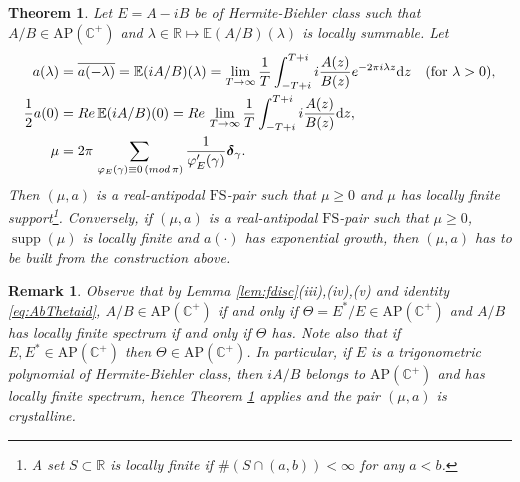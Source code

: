 \documentclass[a4paper,reqno,12pt]{amsart}
\DeclareMathOperator{\supp}{\mathrm{supp}}
\newtheorem{theorem}{Theorem}
\newtheorem{remark}{Remark}
\newcommand{\E}{\mathcal{E}}
\renewcommand{\H}{\mathbb{C}^+}
\renewcommand{\r}{\mathbb{R}}
\newcommand{\re}{{\rm Re}\,}
\newcommand{\bo}{\boldsymbol}
\newcommand{\la}{\lambda}
\newcommand{\ga}{\gamma}
\newcommand{\p}{\varphi}
\renewcommand{\d}{\mathrm{d}}
\newcommand{\1}{{\bf 1}}
\newcommand{\apc}{\mathrm{AP}(\H)}
\newcommand{\fs}{\mathrm{FS}}
\renewcommand{\E}{\mathbb{E}}
\newcommand{\ov}[1]{\overline{#1}}
\renewcommand{\1}{{\bo 1}}
\newcommand{\del}{{\bo \delta}}
\renewcommand{\Re}{{\rm Re}\,}
\renewcommand{\a}{a(\cdot)}
\begin{document}
\begin{theorem}\label{thm:HBmupos}
Let $E=A-iB$ be of Hermite-Biehler class such that $A/B \in \apc$ and $\la\in \r \mapsto \E (A/B)(\la)$ is locally summable. Let
\begin{align}
\begin{split}\label{def:amu}
a(\la)& =\ov{a(-\la)}=\E(iA/B)(\la)=\lim_{T\to\infty} \frac{1}{T}\int_{-T + i}^{T+i} i\frac{A(z)}{B(z)} e^{-2\pi i \la z} \d z \quad (\text{for } \la>0), \\
\frac12 a(0)&=\re \E (iA/B)(0) = \Re \lim_{T\to\infty} \frac{1}{T}\int_{-T + i}^{T+i}  i\frac{A(z)}{B(z)} \d z,  \\
\mu & = 2\pi \sum_{\, \p_E(\ga)\equiv 0 \,({\rm mod} \, \pi)} \frac{1}{\p'_E(\ga)} {\del}_{\ga}.
\end{split}
\end{align}
Then $(\mu,a)$ is a real-antipodal $\fs$-pair such that $\mu\geq 0$ and $\mu$ has locally finite support\footnote{A set $S\subset \r$ is locally finite if $\# (S\cap (a,b)) < \infty$ for any $a<b$.}. Conversely, if $(\mu,a)$ is a real-antipodal $\fs$-pair such that $\mu\geq 0$, $\supp(\mu)$ is locally finite and $\a$ has exponential growth, then $(\mu,a)$ has to be built from the construction above.
\end{theorem}

\begin{remark}\label{rem:ABTheta}
Observe that by Lemma \ref{lem:fdisc}(iii),(iv),(v) and identity \eqref{eq:AbThetaid}, $A/B\in \apc$ if and only if $\Theta=E^*/E\in \apc$ and $A/B$ has locally finite spectrum if and only if $\Theta$ has. Note also that if $E,E^*\in \apc$ then $\Theta\in \apc$. In particular, if $E$ is a {trigonometric polynomia}l of Hermite-Biehler class, then $iA/B$ belongs to $\apc$ and has locally finite spectrum, hence Theorem \ref{thm:HBmupos} applies and the pair $(\mu,a)$ is crystalline.
\end{remark}
\end{document}
